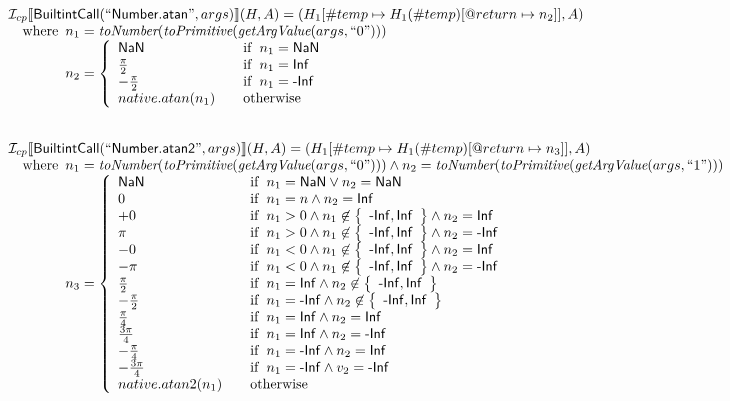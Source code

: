 \[\begin{array}{l}
\I _{cp}\lbr \SF{BuiltintCall}(``\SF{Number.atan}",args)\rbr(H,A)
  = (H_1[\#temp \mapsto H_1(\#temp)[@return \mapsto n_2]], A)\\
\quad\wherec{
  n_1 = \hf{toNumber}(\hf{toPrimitive}(\hf{getArgValue}(args, ``0")))\\
  n_2 = \left\{
    \begin{array}{l@{\quad\quad}l}
      \SF{NaN} & \ifc{n_1=\SF{NaN}}\\
      \frac{\pi}{2} & \ifc{n_1=\SF{Inf}}\\
      -\frac{\pi}{2} & \ifc{n_1=\SF{-Inf}}\\
      native.atan(n_1) & \owc
    \end{array}
  \right.
  }\\
\\\\


\I _{cp}\lbr \SF{BuiltintCall}(``\SF{Number.atan2}",args)\rbr(H,A)
  = (H_1[\#temp \mapsto H_1(\#temp)[@return \mapsto n_3]], A)\\
\quad\wherec{
  n_1 = \hf{toNumber}(\hf{toPrimitive}(\hf{getArgValue}(args, ``0")))
  \land n_2 = \hf{toNumber}(\hf{toPrimitive}(\hf{getArgValue}(args, ``1")))\\
  n_3 = \left\{
    \begin{array}{l@{\quad\quad}l}
      \SF{NaN} & \ifc{n_1=\SF{NaN} \lor n_2=\SF{NaN}}\\
      0 & \ifc{n_1= n \land n_2=\SF{Inf}}\\
      +0 & \ifc{n_1 > 0 \land n_1 \not\in  \set{\SF{-Inf}, \SF{Inf}} \land n_2=\SF{Inf}}\\
      \pi & \ifc{n_1 > 0 \land n_1 \not\in  \set{\SF{-Inf}, \SF{Inf}} \land n_2=\SF{-Inf}}\\
      -0 & \ifc{n_1 < 0 \land n_1 \not\in \set{\SF{-Inf}, \SF{Inf}} \land n_2=\SF{Inf}}\\
      -\pi & \ifc{n_1 < 0 \land n_1 \not\in \set{\SF{-Inf}, \SF{Inf}} \land n_2=\SF{-Inf}}\\
      \frac{\pi}{2} & \ifc{n_1=\SF{Inf} \land n_2 \not\in \set{\SF{-Inf}, \SF{Inf}}}\\
      -\frac{\pi}{2} & \ifc{n_1=\SF{-Inf} \land n_2 \not\in \set{\SF{-Inf}, \SF{Inf}}}\\
      \frac{\pi}{4} & \ifc{n_1=\SF{Inf} \land n_2=\SF{Inf}}\\
      \frac{3\pi}{4} & \ifc{n_1=\SF{Inf} \land n_2=\SF{-Inf}}\\
      -\frac{\pi}{4} & \ifc{n_1=\SF{-Inf} \land n_2=\SF{Inf}}\\
      -\frac{3\pi}{4} & \ifc{n_1=\SF{-Inf} \land v_2=\SF{-Inf}}\\
      native.atan2(n_1) & \owc
    \end{array}
  \right.
  }\\
\\\\


\end{array}\]
